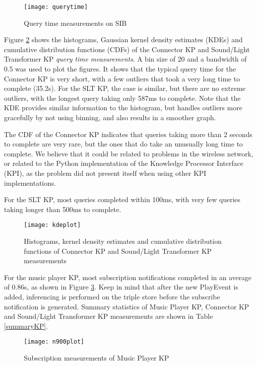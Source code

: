 \begin{figure}
\centering
\texttt{[image: querytime]}
\caption{Query time measurements on SIB}
\label{querytime}
\end{figure}

Figure \ref{kdeplot} shows the histograms, Gaussian kernel density estimates (KDEs) and cumulative distribution functions (CDFs) of the Connector KP and Sound/Light Transformer KP \emph{query time measurements}. A bin size of 20 and a bandwidth of 0.5 was used to plot the figures. It shows that the typical query time for the Connector KP is very short, with a few outliers that took a very long time to complete (35.2s). For the SLT KP, the case is similar, but there are no extreme outliers, with the longest query taking only 587ms to complete. Note that the KDE provides similar information to the histogram, but handles outliers more gracefully by not using binning, and also results in a smoother graph.

The CDF of the Connector KP indicates that queries taking more than 2 seconds to complete are very rare, but the ones that do take an unusually long time to complete. We believe that it could be related to problems in the wireless network, or related to the Python implementation of the Knowledge Processor Interface (KPI), as the problem did not present itself when using other KPI implementations.

For the SLT KP, most queries completed within 100ms, with very few queries taking longer than 500ms to complete.

\begin{figure}
\centering
\texttt{[image: kdeplot]}
\caption{Histograms, kernel density estimates and cumulative distribution functions of Connector KP and Sound/Light Transformer KP measurements}
\label{kdeplot}
\end{figure}

For the music player KP, most subscription notifications completed in an average of 0.86s, as shown in Figure \ref{n900plot}. Keep in mind that after the new PlayEvent is added, inferencing is performed on the triple store before the subscribe notification is generated. Summary statistics of Music Player KP, Connector KP and Sound/Light Transformer KP measurements are shown in Table \ref{summaryKP}.

\begin{figure}
\centering
\texttt{[image: n900plot]}
\caption{Subscription measurements of Music Player KP}
\label{n900plot}
\end{figure}

